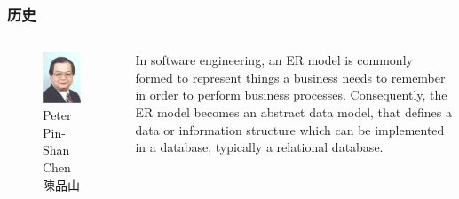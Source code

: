\documentclass[aspectratio=169, 14pt]{beamer}
\begin{document}
\begin{frame}
    \frametitle{历史}
\begin{columns}
    \begin{figure}
        \includegraphics[width=\textwidth]{week10/chen}
        \caption*{Peter Pin-Shan Chen
        \\ 陳品山}
    \end{figure}
    In software engineering, an ER model is commonly formed to represent things a business needs to remember in order to perform business processes. Consequently, the ER model becomes an abstract data model, that defines a data or information structure which can be implemented in a database, typically a relational database. 
\end{columns}

\end{frame}
\end{document}
